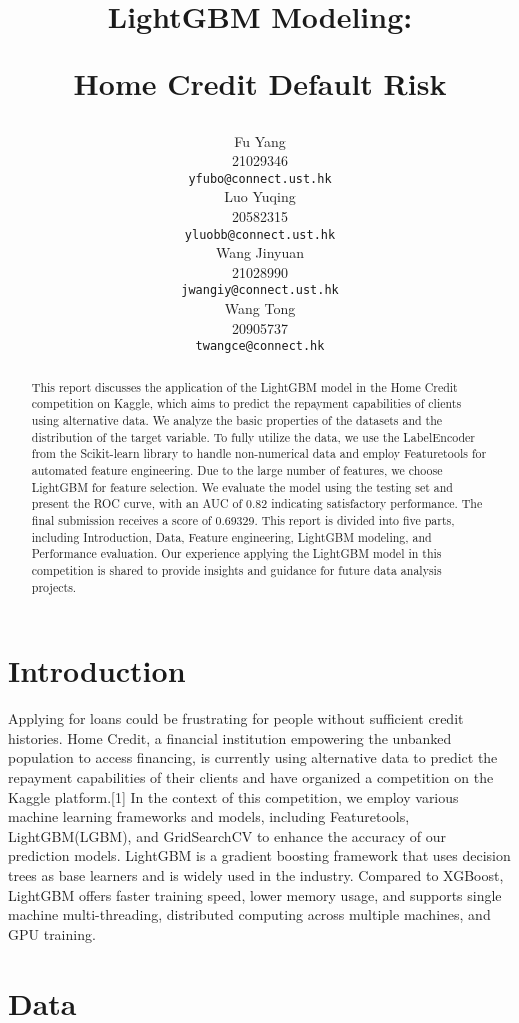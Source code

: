 \documentclass{article}
\title{LightGBM Modeling: 

Home Credit Default Risk}
\author{%
  Fu Yang \\
  21029346\\
  \texttt{yfubo@connect.ust.hk} \\
  \And
  Luo Yuqing \\
  20582315\\
  \texttt{yluobb@connect.ust.hk} \\
  \AND
  Wang Jinyuan \\
  21028990\\
  \texttt{jwangiy@connect.ust.hk} \\
  \And
  Wang Tong \\
  20905737\\
  \texttt{twangce@connect.hk} \\
}
\begin{document}
\maketitle

\begin{abstract}
This report discusses the application of the LightGBM model in the Home Credit competition on Kaggle, which aims to predict the repayment capabilities of clients using alternative data. We analyze the basic properties of the datasets and the distribution of the target variable. To fully utilize the data, we use the LabelEncoder from the Scikit-learn library to handle non-numerical data and employ Featuretools for automated feature engineering. Due to the large number of features, we choose LightGBM for feature selection. We evaluate the model using the testing set and present the ROC curve, with an AUC of 0.82 indicating satisfactory performance. The final submission receives a score of 0.69329. This report is divided into five parts, including Introduction, Data, Feature engineering, LightGBM modeling,  and Performance evaluation. Our experience applying the LightGBM model in this competition is shared to provide insights and guidance for future data analysis projects.

\end{abstract}

\section{Introduction}

Applying for loans could be frustrating for people without sufficient credit histories. Home Credit, a financial institution empowering the unbanked population to access financing, is currently using alternative data to predict the repayment capabilities of their clients and have organized a competition on the Kaggle platform.[1] In the context of this competition, we employ various machine learning frameworks and models, including Featuretools, LightGBM(LGBM), and GridSearchCV to enhance the accuracy of our prediction models. LightGBM is a gradient boosting framework that uses decision trees as base learners and is widely used in the industry. Compared to XGBoost, LightGBM offers faster training speed, lower memory usage, and supports single machine multi-threading, distributed computing across multiple machines, and GPU training.

\section{Data}
\end{document}

